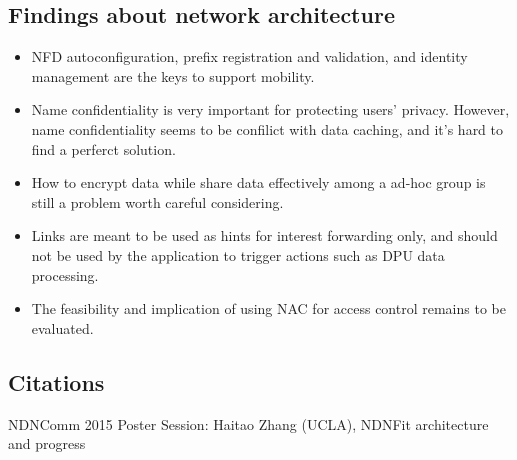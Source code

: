 \documentclass{article}
\begin{document}
\subsection{Findings about network architecture }
\begin{itemize}
	\item NFD autoconfiguration, prefix registration and validation, and identity management are the keys to support mobility.
	\item Name confidentiality is very important for protecting users' privacy. However, name confidentiality seems to be confilict with data caching, and it's hard to find a perferct solution.
	\item How to encrypt data while share data effectively among a ad-hoc group is still a problem worth careful considering.
	\item Links are meant to be used as hints for interest forwarding only, and should not be used by the application to trigger actions such as DPU data processing.
	\item The feasibility and implication of using NAC for access control remains to be evaluated.
\end{itemize}

\subsection{Citations}
NDNComm 2015 Poster Session: Haitao Zhang (UCLA), NDNFit architecture and progress



\end{document}
